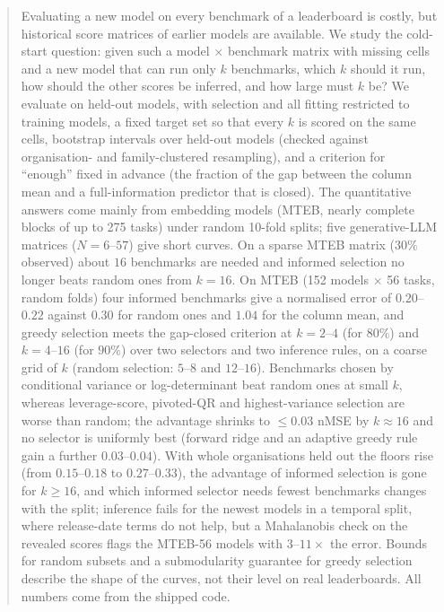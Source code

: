 \begin{abstract}
Evaluating a new model on every benchmark of a leaderboard is costly, but historical score matrices of earlier models are available. We study the cold-start question: given such a model $\times$ benchmark matrix with missing cells and a new model that can run only $k$ benchmarks, which $k$ should it run, how should the other scores be inferred, and how large must $k$ be? We evaluate on held-out models, with selection and all fitting restricted to training models, a fixed target set so that every $k$ is scored on the same cells, bootstrap intervals over held-out models (checked against organisation- and family-clustered resampling), and a criterion for ``enough'' fixed in advance (the fraction of the gap between the column mean and a full-information predictor that is closed). The quantitative answers come mainly from embedding models (MTEB, nearly complete blocks of up to 275 tasks) under random 10-fold splits; five generative-LLM matrices ($N=6$--$57$) give short curves. On a sparse MTEB matrix ($30\%$ observed) about $16$ benchmarks are needed and informed selection no longer beats random ones from $k=16$. On MTEB (152 models $\times$ 56 tasks, random folds) four informed benchmarks give a normalised error of $0.20$--$0.22$ against $0.30$ for random ones and $1.04$ for the column mean, and greedy selection meets the gap-closed criterion at $k=2$--$4$ (for $80\%$) and $k=4$--$16$ (for $90\%$) over two selectors and two inference rules, on a coarse grid of $k$ (random selection: $5$--$8$ and $12$--$16$). Benchmarks chosen by conditional variance or log-determinant beat random ones at small $k$, whereas leverage-score, pivoted-QR and highest-variance selection are worse than random; the advantage shrinks to $\le0.03$ nMSE by $k\approx16$ and no selector is uniformly best (forward ridge and an adaptive greedy rule gain a further $0.03$--$0.04$). With whole organisations held out the floors rise (from $0.15$--$0.18$ to $0.27$--$0.33$), the advantage of informed selection is gone for $k\ge16$, and which informed selector needs fewest benchmarks changes with the split; inference fails for the newest models in a temporal split, where release-date terms do not help, but a Mahalanobis check on the revealed scores flags the MTEB-56 models with $3$--$11\times$ the error. Bounds for random subsets and a submodularity guarantee for greedy selection describe the shape of the curves, not their level on real leaderboards. All numbers come from the shipped code.
\end{abstract}
